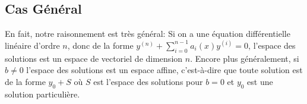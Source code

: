 \documentclass{classe}
\begin{document}
\subsection{Cas Général}
En fait, notre raisonnement est très général:
Si on a une équation différentielle linéaire d'ordre $n$, donc de la forme $y^{(n)} + \sum_{i = 0}^{n - 1} a_{i}(x)y^{(i)} = 0$, l'espace des solutions est un espace de vectoriel de dimension $n$.
Encore plus généralement, si $b \neq 0$ l'espace des solutions est un espace affine, c'est-à-dire que toute solution est de la forme $y_{0} + S$ où $S$ est l'espace des solutions pour $b = 0$ et $y_{0}$ est une solution particulière.
\end{document}
